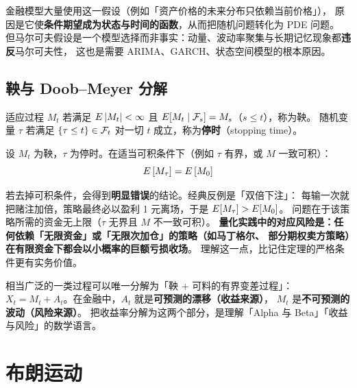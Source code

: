 金融模型大量使用这一假设（例如「资产价格的未来分布只依赖当前价格」），
原因是它使\textbf{条件期望成为状态与时间的函数}，从而把随机问题转化为 PDE 问题。
但马尔可夫假设是一个模型选择而非事实：动量、波动率聚集与长期记忆现象都\textbf{违反}马尔可夫性，
这也是需要 ARIMA、GARCH、状态空间模型的根本原因。

\subsection{鞅与 Doob--Meyer 分解}

\begin{definition}[鞅与停时]\label{def:10-martingale}
适应过程 $M_t$ 若满足 $E\left\lvert M_t \right\rvert<\infty$ 且 $E[M_t\mid\mathcal{F}_s]=M_s$（$s\le t$），称为鞅。
随机变量 $\tau$ 若满足 $\{\tau\le t\}\in\mathcal{F}_t$ 对一切 $t$ 成立，称为\textbf{停时}（stopping time）。
\end{definition}

\begin{theorem}[可选停止定理]\label{thm:10-optional}
设 $M_t$ 为鞅，$\tau$ 为停时。在适当可积条件下（例如 $\tau$ 有界，或 $M$ 一致可积）：
\begin{equation}
  E\left[M_\tau\right] = E\left[M_0\right]
  \label{eq:10-ost}
\end{equation}
\end{theorem}

\begin{warningbox}[可选停止定理的可积条件不可省略]
若去掉可积条件，会得到\textbf{明显错误}的结论。经典反例是「双倍下注」：
每输一次就把赌注加倍，策略最终必以盈利 1 元离场，于是 $E[M_\tau]>E[M_0]$。
问题在于该策略所需的资金无上限（$\tau$ 无界且 $M$ 不一致可积）。
\textbf{量化实践中的对应风险是：任何依赖「无限资金」或「无限次加仓」的策略（如马丁格尔、
部分期权卖方策略）在有限资金下都会以小概率的巨额亏损收场}。
理解这一点，比记住定理的严格条件更有实务价值。
\end{warningbox}

\begin{notebox}
相当广泛的一类过程可以唯一分解为「鞅 + 可料的有界变差过程」：
$X_t = M_t + A_t$。在金融中，$A_t$ 就是\textbf{可预测的漂移（收益来源）}，
$M_t$ 是\textbf{不可预测的波动（风险来源）}。
把收益率分解为这两个部分，是理解「Alpha 与 Beta」「收益与风险」的数学语言。
\end{notebox}

\section{布朗运动}

